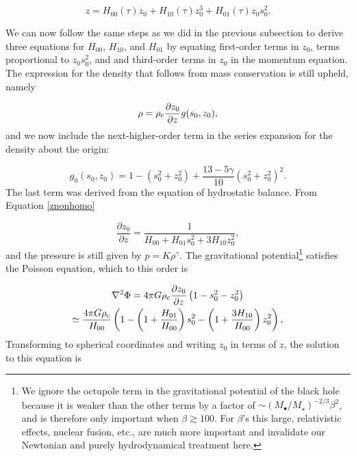 \documentclass[twocolumn]{aastex62}
\begin{document}
\begin{equation}
z = H_{00}(\tau)z_0+H_{10}(\tau) z_0^3 + H_{01}(\tau)z_0s_0^2. \label{znonhomo}
\end{equation}

We can now follow the same steps as we did in the previous subsection to derive three equations for $H_{00}$, $H_{10}$, and $H_{01}$ by equating first-order terms in $z_0$, terms proportional to $z_0s_0^2$, and and third-order terms in $z_0$ in the momentum equation. The expression for the density that follows from mass conservation is still upheld, namely

\begin{equation}
\rho = \rho_{\rm c}\frac{\partial z_0}{\partial z}g(s_0,z_0),
\end{equation}
and we now include the next-higher-order term in the series expansion for the density about the origin:

\begin{equation}
g_0(s_0,z_0) = 1-\left(s_0^2+z_0^2\right)+\frac{13-5\gamma}{10}\left(s_0^2+z_0^2\right)^2. \label{rho0}
\end{equation}
The last term was derived from the equation of hydrostatic balance. From Equation \eqref{znonhomo}

\begin{equation}
\frac{\partial z_0}{\partial z} = \frac{1}{H_{00}+H_{01}s_0^2+3H_{10} z_0^2}, 
\end{equation}
and the pressure is still given by $p = K\rho^{\gamma}$. The gravitational potential\footnote{We ignore the octupole term in the gravitational potential of the black hole because it is weaker than the other terms by a factor of $\sim (M_{\bullet}/M_{\star})^{-2/3}\beta^2$, and is therefore only important when $\beta \gtrsim 100$. For $\beta$'s this large, relativistic effects, nuclear fusion, etc., are much more important and invalidate our Newtonian and purely hydrodynamical treatment here.} satisfies the Poisson equation, which to this order is

\begin{multline}
\nabla^2\Phi = 4\pi G\rho_{\rm c}\frac{\partial z_0}{\partial z}\left(1-s_0^2-z_0^2\right) \\
\simeq \frac{4\pi G\rho_{\rm c}}{H_{00}}\left(1-\left(1+\frac{H_{01}}{H_{00}}\right)s_0^2-\left(1+\frac{3H_{10}}{H_{00}}\right)z_0^2\right),
\end{multline}
Transforming to spherical coordinates and writing $z_0$ in terms of $z$, the solution to this equation is
\end{document}
